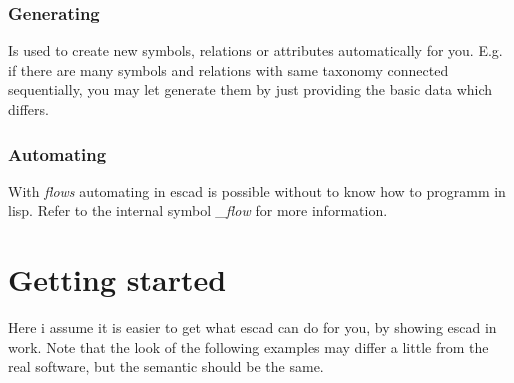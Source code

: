 \documentclass[a4paper, 12pt, openany]{scrbook}
\begin{document}
\subsection{Generating}
Is used to create new symbols, relations or attributes automatically for you. E.g. if there are many symbols and relations with same taxonomy connected sequentially, you may let generate them by just providing the basic data which differs.
\subsection{Automating}
With \emph{flows} automating in escad is possible without to know how to programm in lisp. Refer to the internal symbol \emph{\_flow} for more information.
\chapter{Getting started}\label{cha:gettingstarted}
Here i assume it is easier to get what escad can do for you, by showing escad in work. Note that the look of the following examples may differ a little from the real software, but the semantic should be the same.
\end{document}
